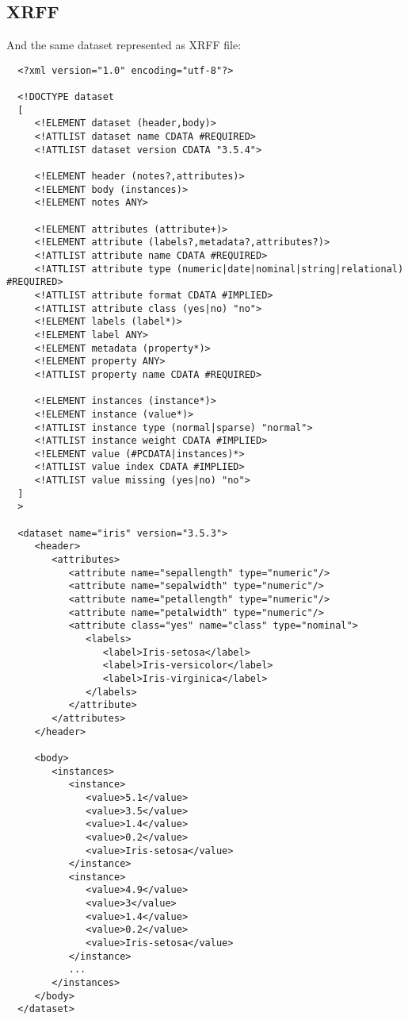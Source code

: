 \subsection{XRFF}
And the same dataset represented as XRFF file:

\begin{verbatim}
  <?xml version="1.0" encoding="utf-8"?>

  <!DOCTYPE dataset
  [
     <!ELEMENT dataset (header,body)>
     <!ATTLIST dataset name CDATA #REQUIRED>
     <!ATTLIST dataset version CDATA "3.5.4">

     <!ELEMENT header (notes?,attributes)>
     <!ELEMENT body (instances)>
     <!ELEMENT notes ANY>   

     <!ELEMENT attributes (attribute+)>
     <!ELEMENT attribute (labels?,metadata?,attributes?)>
     <!ATTLIST attribute name CDATA #REQUIRED>
     <!ATTLIST attribute type (numeric|date|nominal|string|relational) #REQUIRED>
     <!ATTLIST attribute format CDATA #IMPLIED>
     <!ATTLIST attribute class (yes|no) "no">
     <!ELEMENT labels (label*)>   
     <!ELEMENT label ANY>
     <!ELEMENT metadata (property*)>
     <!ELEMENT property ANY>
     <!ATTLIST property name CDATA #REQUIRED>

     <!ELEMENT instances (instance*)>
     <!ELEMENT instance (value*)>
     <!ATTLIST instance type (normal|sparse) "normal">
     <!ATTLIST instance weight CDATA #IMPLIED>
     <!ELEMENT value (#PCDATA|instances)*>
     <!ATTLIST value index CDATA #IMPLIED>   
     <!ATTLIST value missing (yes|no) "no">
  ]
  >

  <dataset name="iris" version="3.5.3">
     <header>
        <attributes>
           <attribute name="sepallength" type="numeric"/>
           <attribute name="sepalwidth" type="numeric"/>
           <attribute name="petallength" type="numeric"/>
           <attribute name="petalwidth" type="numeric"/>
           <attribute class="yes" name="class" type="nominal">
              <labels>
                 <label>Iris-setosa</label>
                 <label>Iris-versicolor</label>
                 <label>Iris-virginica</label>
              </labels>
           </attribute>
        </attributes>
     </header>

     <body>
        <instances>
           <instance>
              <value>5.1</value>
              <value>3.5</value>
              <value>1.4</value>
              <value>0.2</value>
              <value>Iris-setosa</value>
           </instance>
           <instance>
              <value>4.9</value>
              <value>3</value>
              <value>1.4</value>
              <value>0.2</value>
              <value>Iris-setosa</value>
           </instance>
           ...
        </instances>
     </body>
  </dataset>
\end{verbatim}

